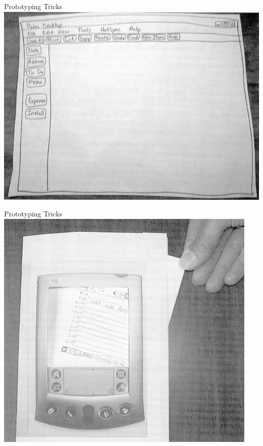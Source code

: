 \documentclass[10pt]{beamer}
\begin{document}
\begin{frame}{Prototyping Tricks}
\centering
	\includegraphics[width=\linewidth]{img/desktopsketch.png}
\end{frame}

\begin{frame}{Prototyping Tricks}
\centering
	\includegraphics[width=\linewidth]{img/pagessketch.png}
\end{frame}
\end{document}
